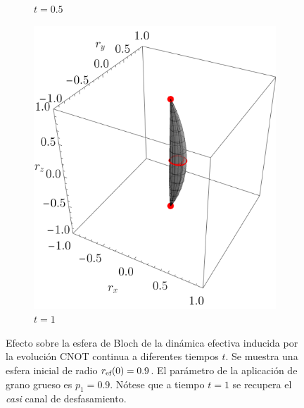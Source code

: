 \begin{figure}[ht!]
\begin{subfigure}{0.32\textwidth}
      \caption{$t=0.5$}
    \end{subfigure}
    \begin{subfigure}{0.32\textwidth}
      \centering
      \includegraphics[width=0.9\linewidth]{chapter4/figures_toy/CNOT_p=0.9_t=1._r=0.9.png}
      \caption{$t=1$}
    \end{subfigure}
    \caption{Efecto sobre la esfera de Bloch de la dinámica efectiva inducida por la evolución CNOT continua a diferentes tiempos $t$. Se muestra una esfera inicial de radio $r_{\text{ef}}(0)=0.9$. El parámetro de la aplicación de grano grueso es $p_{1}=0.9$. Nótese que a tiempo $t=1$ se recupera el \textit{casi} canal de desfasamiento.  \label{fig:AlmostPhaseFlipSequence}}
    \end{figure}

